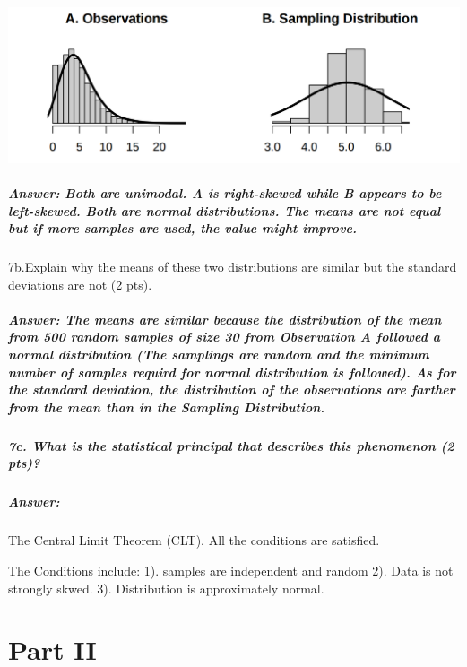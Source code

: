 \documentclass[]{article}
\let\oldsubparagraph\subparagraph
\renewcommand{\subparagraph}[1]{\oldsubparagraph{#1}\mbox{}}
\begin{document}
\includegraphics{exm1.png}

\subparagraph{Answer: Both are unimodal. A is right-skewed while B
appears to be left-skewed. Both are normal distributions. The means are
not equal but if more samples are used, the value might
improve.}\label{answer-both-are-unimodal.-a-is-right-skewed-while-b-appears-to-be-left-skewed.-both-are-normal-distributions.-the-means-are-not-equal-but-if-more-samples-are-used-the-value-might-improve.}

7b.Explain why the means of these two distributions are similar but the
standard deviations are not (2 pts).

\subparagraph{Answer: The means are similar because the distribution of
the mean from 500 random samples of size 30 from Observation A followed
a normal distribution (The samplings are random and the minimum number
of samples requird for normal distribution is followed). As for the
standard deviation, the distribution of the observations are farther
from the mean than in the Sampling
Distribution.}\label{answer-the-means-are-similar-because-the-distribution-of-the-mean-from-500-random-samples-of-size-30-from-observation-a-followed-a-normal-distribution-the-samplings-are-random-and-the-minimum-number-of-samples-requird-for-normal-distribution-is-followed.-as-for-the-standard-deviation-the-distribution-of-the-observations-are-farther-from-the-mean-than-in-the-sampling-distribution.}

\subparagraph{7c. What is the statistical principal that describes this
phenomenon (2
pts)?}\label{c.-what-is-the-statistical-principal-that-describes-this-phenomenon-2-pts}

\subparagraph{Answer:}\label{answer-3}

The Central Limit Theorem (CLT). All the conditions are satisfied.

The Conditions include: 1). samples are independent and random 2). Data
is not strongly skwed. 3). Distribution is approximately normal.

\section{Part II}\label{part-ii}
\end{document}
